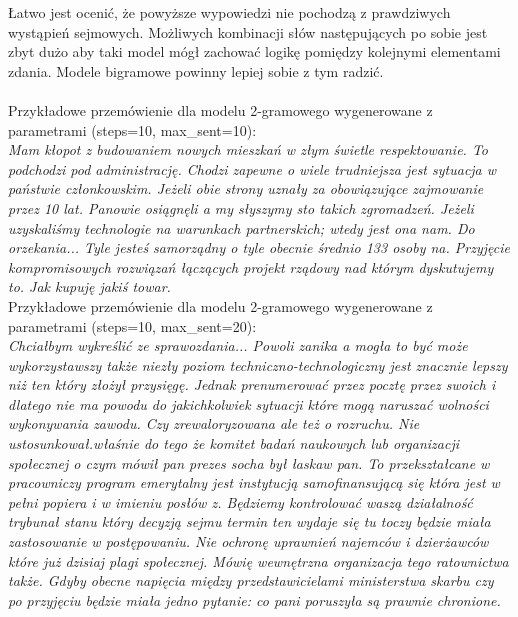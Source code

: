 \documentclass[a4paper,11pt,twoside]{report}
\theoremstyle{definition}
\begin{document}
Łatwo jest ocenić, że powyższe wypowiedzi nie pochodzą z prawdziwych wystąpień sejmowych. Możliwych kombinacji słów następujących po sobie jest zbyt dużo aby taki model mógł zachować logikę pomiędzy kolejnymi elementami zdania. Modele bigramowe powinny lepiej sobie z tym radzić.\\\\
Przykładowe przemówienie dla modelu 2-gramowego wygenerowane z parametrami (steps=10, max\_sent=10):\\
\textit{Mam kłopot z budowaniem nowych mieszkań w złym świetle respektowanie. To podchodzi pod administrację. Chodzi zapewne o wiele trudniejsza jest sytuacja w państwie członkowskim. Jeżeli obie strony uznały za obowiązujące zajmowanie przez 10 lat. Panowie osiągnęli a my słyszymy sto takich zgromadzeń. Jeżeli uzyskaliśmy technologie na warunkach partnerskich; wtedy jest ona nam. Do orzekania... Tyle jesteś samorządny o tyle obecnie średnio 133 osoby na. Przyjęcie kompromisowych rozwiązań łączących projekt rządowy nad którym dyskutujemy to. Jak kupuję jakiś towar.}\\

Przykładowe przemówienie dla modelu 2-gramowego wygenerowane z parametrami (steps=10, max\_sent=20):\\ \textit{Chciałbym wykreślić ze sprawozdania... Powoli zanika a mogła to być może wykorzystawszy także niezły poziom techniczno-technologiczny jest znacznie lepszy niż ten który złożył przysięgę. Jednak prenumerować przez pocztę przez swoich i dlatego nie ma powodu do jakichkolwiek sytuacji które mogą naruszać wolności wykonywania zawodu. Czy zrewaloryzowana ale też o rozruchu. Nie ustosunkował.właśnie do tego że komitet badań naukowych lub organizacji społecznej o czym mówił pan prezes socha był łaskaw pan. To przekształcane w pracowniczy program emerytalny jest instytucją samofinansującą się która jest w pełni popiera i w imieniu posłów z. Będziemy kontrolować waszą działalność trybunał stanu który decyzją sejmu termin ten wydaje się tu toczy będzie miała zastosowanie w postępowaniu. Nie ochronę uprawnień najemców i dzierżawców które już dzisiaj plagi społecznej. Mówię wewnętrzna organizacja tego ratownictwa także. Gdyby obecne napięcia między przedstawicielami ministerstwa skarbu czy po przyjęciu będzie miała jedno pytanie: co pani poruszyła są prawnie chronione.}\\
\end{document}
